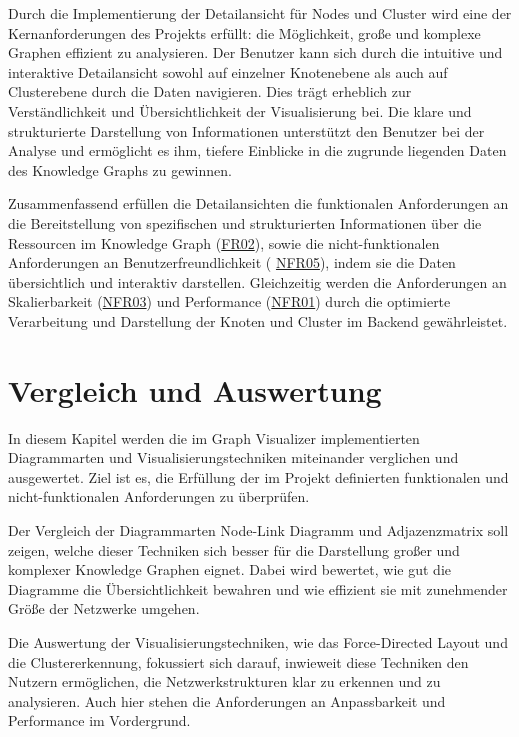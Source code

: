 Durch die Implementierung der Detailansicht für Nodes und Cluster wird eine der Kernanforderungen des Projekts erfüllt: die Möglichkeit, große und komplexe Graphen effizient zu analysieren. Der Benutzer kann sich durch die intuitive und interaktive Detailansicht sowohl auf einzelner Knotenebene als auch auf Clusterebene durch die Daten navigieren. Dies trägt erheblich zur Verständlichkeit und Übersichtlichkeit der Visualisierung bei. Die klare und strukturierte Darstellung von Informationen unterstützt den Benutzer bei der Analyse und ermöglicht es ihm, tiefere Einblicke in die zugrunde liegenden Daten des Knowledge Graphs zu gewinnen.

Zusammenfassend erfüllen die Detailansichten die funktionalen Anforderungen an die Bereitstellung von spezifischen und strukturierten Informationen über die Ressourcen im Knowledge Graph (\hyperref[FR02]{FR02}), sowie die nicht-funktionalen Anforderungen an Benutzerfreundlichkeit ( \hyperref[NFR05]{NFR05}), indem sie die Daten übersichtlich und interaktiv darstellen. Gleichzeitig werden die Anforderungen an Skalierbarkeit (\hyperref[NFR03]{NFR03}) und Performance (\hyperref[NFR01]{NFR01}) durch die optimierte Verarbeitung und Darstellung der Knoten und Cluster im Backend gewährleistet.

\section{Vergleich und Auswertung}
\label{realization:comparison}

In diesem Kapitel werden die im Graph Visualizer implementierten Diagrammarten und Visualisierungstechniken miteinander verglichen und ausgewertet. Ziel ist es, die Erfüllung der im Projekt definierten funktionalen und nicht-funktionalen Anforderungen zu überprüfen.

Der Vergleich der Diagrammarten Node-Link Diagramm und Adjazenzmatrix soll zeigen, welche dieser Techniken sich besser für die Darstellung großer und komplexer Knowledge Graphen eignet. Dabei wird bewertet, wie gut die Diagramme die Übersichtlichkeit bewahren und wie effizient sie mit zunehmender Größe der Netzwerke umgehen.

Die Auswertung der Visualisierungstechniken, wie das Force-Directed Layout und die Clustererkennung, fokussiert sich darauf, inwieweit diese Techniken den Nutzern ermöglichen, die Netzwerkstrukturen klar zu erkennen und zu analysieren. Auch hier stehen die Anforderungen an Anpassbarkeit und Performance im Vordergrund.

